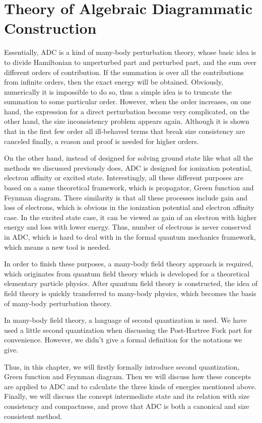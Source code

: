 \chapter{Theory of Algebraic Diagrammatic Construction}

Essentially, ADC is a kind of many-body perturbation theory, whose basic idea is to divide Hamiltonian to unperturbed part and perturbed part, and the sum over different orders of contribution.
If the summation is over all the contributions from infinite orders, then the exact energy will be obtained.
Obviously, numerically it is impossible to do so, thus a simple idea is to truncate the summation to some particular order.
However, when the order increases, on one hand, the expression for a direct perturbation become very complicated, on the other hand, the size inconsistency problem appears again.
Although it is shown that in the first few order all ill-behaved terms that break size consistency are canceled finally, a reason and proof is needed for higher orders.

On the other hand, instead of designed for solving ground state like what all the methods we discussed previously does, ADC is designed for ionization potential, electron affinity or excited state.
Interestingly, all these different purposes are based on a same theoretical framework, which is propagator, Green function and Feynman diagram.
There similarity is that all these processes include gain and loss of electrons, which is obvious in the ionization potential and electron affinity case.
In the excited state case, it can be viewed as gain of an electron with higher energy and loss with lower energy.
Thus, number of electrons is never conserved in ADC, which is hard to deal with in the formal quantum mechanics framework, which means a new tool is needed.

In order to finish these purposes, a many-body field theory approach is required, which originates from quantum field theory which is developed for a theoretical elementary particle physics.
After quantum field theory is constructed, the idea of field theory is quickly transferred to many-body physics, which becomes the basis of many-body perturbation theory.

In many-body field theory, a language of second quantization is used.
We have used a little second quantization when discussing the Post-Hartree Fock part for convenience.
However, we didn't give a formal definition for the notations we give.

Thus, in this chapter, we will firstly formally introduce second quantization, Green function and Feynman diagram.
Then we will discuss how these concepts are applied to ADC and to calculate the three kinds of energies mentioned above.
Finally, we will discuss the concept intermediate state and its relation with size consistency and compactness, and prove that ADC is both a canonical and size consistent method.


